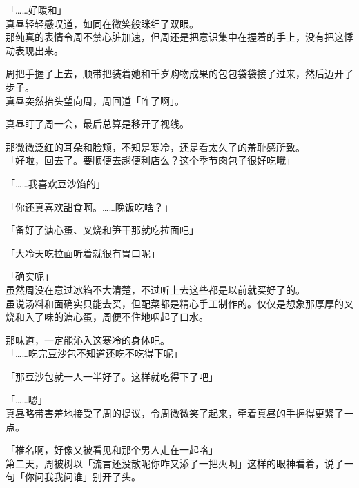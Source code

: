 「……好暖和」\\

真昼轻轻感叹道，如同在微笑般眯细了双眼。\\

那纯真的表情令周不禁心脏加速，但周还是把意识集中在握着的手上，没有把这悸动表现出来。

周把手握了上去，顺带把装着她和千岁购物成果的包包袋袋接了过来，然后迈开了步子。\\

真昼突然抬头望向周，周回道「咋了啊」。

真昼盯了周一会，最后总算是移开了视线。

那微微泛红的耳朵和脸颊，不知是寒冷，还是看太久了的羞耻感所致。\\

「好啦，回去了。要顺便去趟便利店么？这个季节肉包子很好吃哦」

「……我喜欢豆沙馅的」

「你还真喜欢甜食啊。……晚饭吃啥？」

「备好了溏心蛋、叉烧和笋干那就吃拉面吧」

「大冷天吃拉面听着就很有胃口呢」

「确实呢」\\

虽然周没在意过冰箱不大清楚，不过听上去这些都是以前就买好了的。\\

虽说汤料和面确实只能去买，但配菜都是精心手工制作的。仅仅是想象那厚厚的叉烧和入了味的溏心蛋，周便不住地咽起了口水。

那味道，一定能沁入这寒冷的身体吧。\\

「……吃完豆沙包不知道还吃不吃得下呢」

「那豆沙包就一人一半好了。这样就吃得下了吧」

「……嗯」\\

真昼略带害羞地接受了周的提议，令周微微笑了起来，牵着真昼的手握得更紧了一点。\\

\vspace{2\baselineskip}

「椎名啊，好像又被看见和那个男人走在一起咯」\\

第二天，周被树以「流言还没散呢你咋又添了一把火啊」这样的眼神看着，说了一句「你问我我问谁」别开了头。
